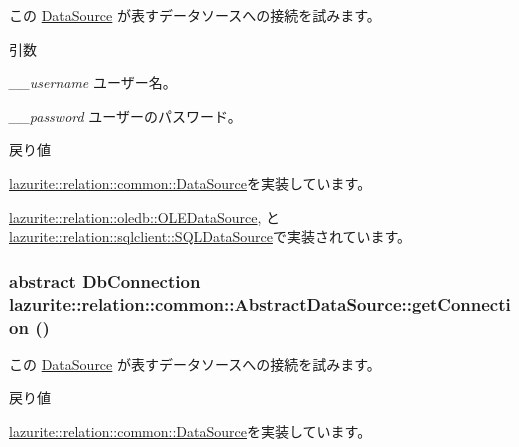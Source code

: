 この \hyperlink{interfacelazurite_1_1relation_1_1common_1_1_data_source}{DataSource} が表すデータソースへの接続を試みます。 
\begin{DoxyParams}{引数}
\item[{\em \_\-\_\-username}]ユーザー名。\item[{\em \_\-\_\-password}]ユーザーのパスワード。\end{DoxyParams}
\begin{DoxyReturn}{戻り値}

\end{DoxyReturn}


\hyperlink{interfacelazurite_1_1relation_1_1common_1_1_data_source_a692379eb1733a5c36a25b141e6091a01}{lazurite::relation::common::DataSource}を実装しています。

\hyperlink{classlazurite_1_1relation_1_1oledb_1_1_o_l_e_data_source_a8bcb0954e47ca8ec4c117ade3e9f0ce9}{lazurite::relation::oledb::OLEDataSource}, と \hyperlink{classlazurite_1_1relation_1_1sqlclient_1_1_s_q_l_data_source_a49e9bb60b11cb3d984257702a566e869}{lazurite::relation::sqlclient::SQLDataSource}で実装されています。\hypertarget{classlazurite_1_1relation_1_1common_1_1_abstract_data_source_a1706b5b8821b00ad2391dd0fcf98a767}{
\subsubsection[{getConnection}]{\setlength{\rightskip}{0pt plus 5cm}abstract DbConnection lazurite::relation::common::AbstractDataSource::getConnection ()}}
\label{classlazurite_1_1relation_1_1common_1_1_abstract_data_source_a1706b5b8821b00ad2391dd0fcf98a767}


この \hyperlink{interfacelazurite_1_1relation_1_1common_1_1_data_source}{DataSource} が表すデータソースへの接続を試みます。 \begin{DoxyReturn}{戻り値}

\end{DoxyReturn}


\hyperlink{interfacelazurite_1_1relation_1_1common_1_1_data_source_a463c3bbeedcd8a6332ec0a87eb530a3c}{lazurite::relation::common::DataSource}を実装しています。

